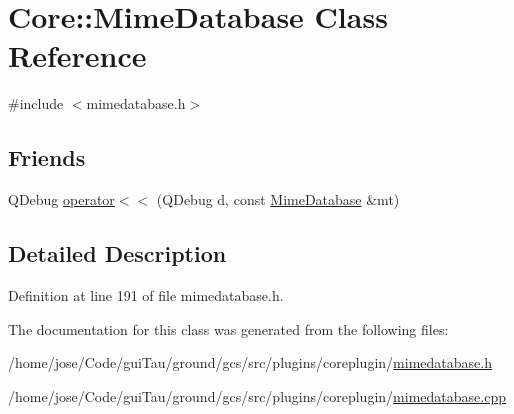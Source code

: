 \hypertarget{class_core_1_1_mime_database}{\section{Core\-:\-:Mime\-Database Class Reference}
\label{class_core_1_1_mime_database}
}


{\ttfamily \#include $<$mimedatabase.\-h$>$}

\subsection*{Friends}
\begin{DoxyCompactItemize}
\item 
Q\-Debug \hyperlink{group___core_plugin_gaa9ac23651f76ab5718a0afd635805cc4}{operator$<$$<$} (Q\-Debug d, const \hyperlink{class_core_1_1_mime_database}{Mime\-Database} \&mt)
\end{DoxyCompactItemize}


\subsection{Detailed Description}


Definition at line 191 of file mimedatabase.\-h.



The documentation for this class was generated from the following files\-:\begin{DoxyCompactItemize}
\item 
/home/jose/\-Code/gui\-Tau/ground/gcs/src/plugins/coreplugin/\hyperlink{mimedatabase_8h}{mimedatabase.\-h}\item 
/home/jose/\-Code/gui\-Tau/ground/gcs/src/plugins/coreplugin/\hyperlink{mimedatabase_8cpp}{mimedatabase.\-cpp}\end{DoxyCompactItemize}
